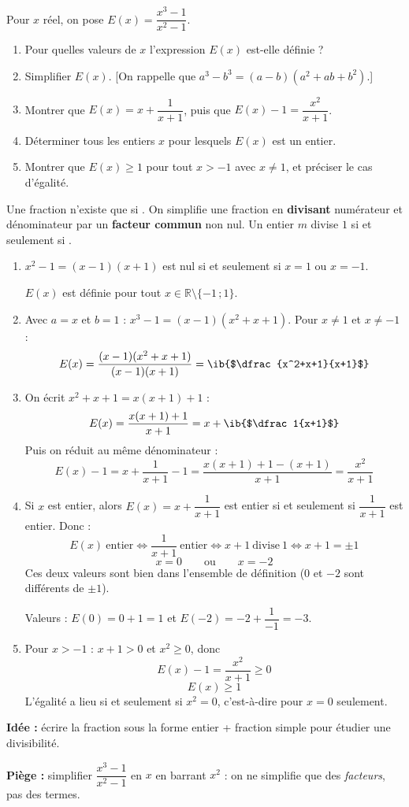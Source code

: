 
Pour $x$ réel, on pose $E(x)=\dfrac{x^3-1}{x^2-1}$.
\begin{enumerate}
  \item Pour quelles valeurs de $x$ l'expression $E(x)$ est-elle définie ?
  \item Simplifier $E(x)$. [On rappelle que $a^3-b^3=(a-b)(a^2+ab+b^2)$.]
  \item Montrer que $E(x)=x+\dfrac1{x+1}$, puis que $E(x)-1=\dfrac{x^2}{x+1}$.
  \item Déterminer tous les entiers $x$ pour lesquels $E(x)$ est un entier.
  \item Montrer que $E(x)\geq1$ pour tout $x>-1$ avec $x\neq1$, et préciser le cas d'égalité.
\end{enumerate}

\begin{prop}[Outils]
Une fraction n'existe que si . On simplifie une fraction en \textbf{divisant} numérateur et dénominateur par un \textbf{facteur commun} non nul. Un entier $m$ divise $1$ si et seulement si .
\end{prop}
\begin{enumerate}
  \item $x^2-1=(x-1)(x+1)$ est nul si et seulement si $x=1$ ou $x=-1$.

  $E(x)$ est définie pour tout $x\in\mathbb R\setminus\{-1\,;1\}$.

  \item Avec $a=x$ et $b=1$ : $x^3-1=(x-1)(x^2+x+1)$. Pour $x\neq1$ et $x\neq-1$ :
  \[E(x)=\dfrac{(x-1)(x^2+x+1)}{(x-1)(x+1)}=\ib{$\dfrac{x^2+x+1}{x+1}$}\]

  \item On écrit $x^2+x+1=x(x+1)+1$ :
  \[E(x)=\dfrac{x(x+1)+1}{x+1}=x+\ib{$\dfrac1{x+1}$}\]
  Puis on réduit au même dénominateur :
  \[E(x)-1=x+\dfrac1{x+1}-1=\dfrac{x(x+1)+1-(x+1)}{x+1}=\dfrac{x^2}{x+1}\]

  \item Si $x$ est entier, alors $E(x)=x+\dfrac1{x+1}$ est entier si et seulement si $\dfrac1{x+1}$ est entier. Donc :
  \[E(x)\ \text{entier}\iff\dfrac1{x+1}\ \text{entier}\iff x+1\ \text{divise}\ 1\iff x+1=\pm1\]
  \[x=0\qquad\text{ou}\qquad x=-2\]
  Ces deux valeurs sont bien dans l'ensemble de définition ($0$ et $-2$ sont différents de $\pm1$).

  Valeurs : $E(0)=0+1=\boxed{1}$ et $E(-2)=-2+\dfrac1{-1}=\boxed{-3}$.

  \item Pour $x>-1$ : $x+1>0$ et $x^2\geq0$, donc
  \[E(x)-1=\dfrac{x^2}{x+1}\geq0\]
  \[E(x)\geq1\]
  L'égalité a lieu si et seulement si $x^2=0$, c'est-à-dire pour $\boxed{x=0}$ seulement.
\end{enumerate}
\textbf{Idée :} écrire la fraction sous la forme \og entier + fraction simple \fg{} pour étudier une divisibilité.

\textbf{Piège :} simplifier $\dfrac{x^3-1}{x^2-1}$ en $x$ en barrant \og $x^2$ \fg{} : on ne simplifie que des \emph{facteurs}, pas des termes.
